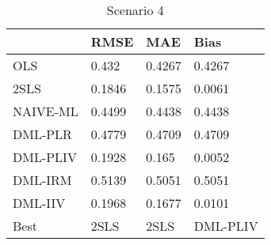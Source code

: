 \begin{table}[H]
\centering
\caption{Scenario 4}
\label{Scenario4}
\begin{tabular}{L{3.3333333333333335cm}L{2.6666666666666665cm}R{2.0cm}R{2.6666666666666665cm}}
\toprule
{} &    RMSE &     MAE &      Bias \\
\midrule
OLS      &   0.432 &  0.4267 &    0.4267 \\
2SLS     &  0.1846 &  0.1575 &    0.0061 \\
NAIVE-ML &  0.4499 &  0.4438 &    0.4438 \\
DML-PLR  &  0.4779 &  0.4709 &    0.4709 \\
DML-PLIV &  0.1928 &   0.165 &    0.0052 \\
DML-IRM  &  0.5139 &  0.5051 &    0.5051 \\
DML-IIV  &  0.1968 &  0.1677 &    0.0101 \\
Best     &    2SLS &    2SLS &  DML-PLIV \\
\bottomrule
\end{tabular}
\end{table}
